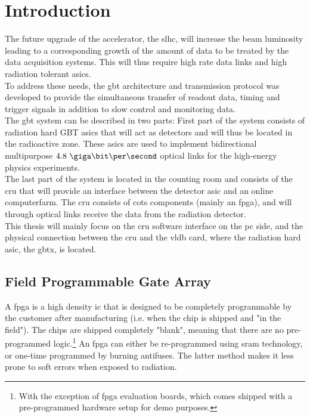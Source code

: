 \documentclass[main.tex]{subfiles}
\begin{document}
\chapter{Introduction}
The future upgrade of the  accelerator, the \gls{slhc}, will increase the beam luminosity leading to a corresponding growth of the amount of data to be treated by the data acquisition systems. This will thus require high rate data links and high radiation tolerant \glspl{asic}.\\

To address these needs, the \gls{gbt} architecture and transmission protocol was developed to provide the simultaneous transfer of readout data, timing and trigger signals in addition to slow control and monitoring data. \\

The \gls{gbt} system can be described in two parts: First part of the system consists of radiation hard GBT \acrshort{asic}s that will act as detectors and will thus be located in the radioactive zone. These \glspl{asic} are used to implement bidirectional multipurpose $4.8~\giga\bit\per\second$ optical links for the high-energy physics experiments. \\
The last part of the system is located in the counting room and consists of the \gls{cru} that will provide an interface between the detector \acrshort{asic} and an online computerfarm. The \gls{cru} consists of \gls{cots} components (mainly an \acrshort{fpga}), and will through optical links receive the data from the radiation detector. \\

This thesis will mainly focus on the \gls{cru} software interface on the \acrshort{pc} side, and the physical connection between the \gls{cru} and the \gls{vldb} card, where the radiation hard \gls{asic}, the \gls{gbt}x, is located.


\section{Field Programmable Gate Array}

A \gls{fpga} is a high density \gls{ic} that is designed to be completely programmable by the customer after manufacturing (i.e. when the chip is shipped and "in the field"). The chips are shipped completely "blank", meaning that there are no pre-programmed logic.\footnote{With the exception of \gls{fpga} evaluation boards, which comes shipped with a pre-programmed hardware setup for demo purposes.} An \gls{fpga} can either be re-programmed using \gls{sram} technology, or one-time programmed by burning antifuses. The latter method makes it less prone to soft errors when exposed to radiation.\\
\end{document}
